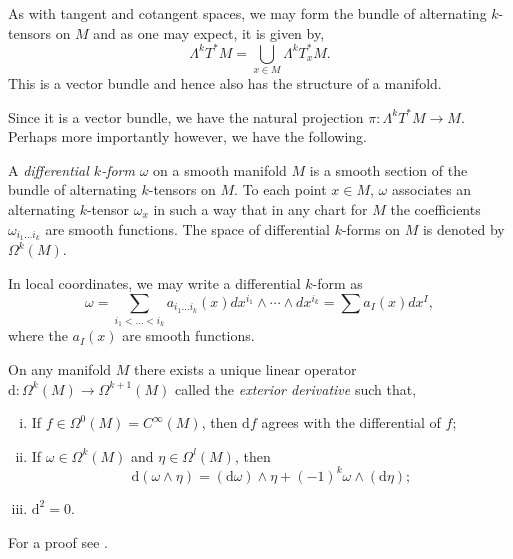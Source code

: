As with tangent and cotangent spaces, we may form the bundle of alternating $k$-tensors on $M$ and as one may expect, it is given by,
\[
\Lambda^kT^*M=\bigcup_{x\in M}\Lambda^kT^*_xM.
\]  
This is a vector bundle and hence also has the structure of a manifold.

Since it is a vector bundle, we have the natural projection $\pi:\Lambda^kT^*M\to M$. Perhaps more importantly however, we have the following.
\begin{definition}
A \textit{differential $k$-form} $\omega$ on a smooth manifold $M$ is a smooth section of the bundle of alternating $k$-tensors on $M$. To each point $x\in M$, $\omega$ associates an alternating $k$-tensor $\omega_x$ in such a way that in any chart for $M$ the coefficients $\omega_{i_1\ldots i_k}$ are smooth functions. The space of differential $k$-forms on $M$ is denoted by $\Omega^k(M)$.
\end{definition}
In local coordinates, we may write a differential $k$-form as
\[
\omega=\sum_{i_1<\ldots<i_k}a_{i_1\ldots i_k}(x)dx^{i_1}\wedge\cdots\wedge dx^{i_k}=\sum a_I(x)dx^I,	
\]
where the $a_I(x)$ are smooth functions.
\pagebreak
\begin{proposition}
On any manifold $M$ there exists a unique linear operator $\mathrm{d}:\Omega^k(M)\to\Omega^{k+1}(M)$ called the \textit{exterior derivative} such that,
\begin{enumerate}[(i)]
\item If $f\in\Omega^0(M)=C^{\infty}(M)$, then $\mathrm{d}f$ agrees with the differential of $f$;
\item If $\omega\in\Omega^k(M)$ and $\eta\in\Omega^l(M)$, then
\[
\mathrm{d}(\omega\wedge\eta)=(\mathrm{d}\omega)\wedge\eta+(-1)^k\omega\wedge(\mathrm{d}\eta);
\]
\item $\mathrm{d}^2=0$.
\end{enumerate}
\end{proposition}
For a proof see \cite{andrews}.\\

